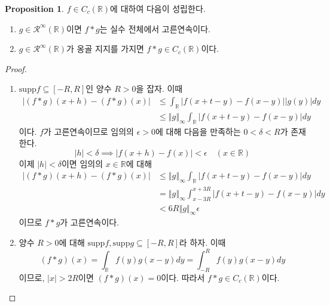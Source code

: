 \documentclass[11pt]{book}
\numberwithin{equation}{chapter}
\def\RR{\mathbb{R}}
\def\eps{\epsilon}
\def\calR{\mathcal{R}}
\newcommand{\abs}[1]{\left\vert#1\right\vert}
\newcommand{\norm}[1]{\left\Vert#1\right\Vert}
\theoremstyle{definition}
\newtheorem{prop}[thm]{Proposition}
\newenvironment{enum}
	{\begin{enumerate}[label=(\alph*), leftmargin=2\parindent]}
	{\end{enumerate}}
\begin{document}
\begin{prop}
    \(f \in C_c(\RR)\)에 대하여 다음이 성립한다.
    \begin{enum}
        \item \(g \in \calR^\infty(\RR)\)이면 \(f * g\)는 실수 전체에서 고른연속이다.
        \item \(g \in \calR^\infty(\RR)\)가 옹골 지지를 가지면 \(f * g \in C_c(\RR)\)이다.
    \end{enum}
\end{prop}
\begin{proof}
    \quad

    \begin{enum}
        \item
        \(\mathrm{supp} f \subseteq [-R, R]\)인 양수 \(R > 0\)을 잡자. 이때
        \begin{align*}
            \abs{(f*g)(x+h) - (f*g)(x)} &\le \int_{\RR} \abs{f(x+t-y) - f(x-y)} \abs{g(y)} dy\\
            &\le \norm{g}_{\infty} \int_{\RR} \abs{f(x+t-y) - f(x-y)} dy    
        \end{align*}
        이다. \(f\)가 고른연속이므로 임의의 \(\eps > 0\)에 대해 다음을 만족하는 \(0 < \delta < R\)가 존재한다.
        \[
        \abs{h} < \delta \implies \abs{f(x+h) - f(x)} < \eps \quad (x \in \RR)    
        \]
        이제 \(\abs{h} < \delta\)이면 임의의 \(x \in \RR\)에 대해
        \begin{align*}
            \abs{(f*g)(x+h) - (f*g)(x)} &\le \norm{g}_{\infty} \int_{\RR} \abs{f(x+t-y) - f(x-y)} dy    \\
            &= \norm{g}_{\infty} \int_{x-3R}^{x+3R} \abs{f(x+t-y) - f(x-y)} dy\\
            &< 6R\norm{g}_{\infty}\eps
        \end{align*}
        이므로 \(f*g\)가 고른연속이다.
        \item 양수 \(R > 0\)에 대해 \(\mathrm{supp}f, \mathrm{supp}g \subseteq [-R, R]\)라 하자. 이때
        \[
        (f*g)(x) = \int_{\RR} f(y) g(x - y) dy = \int_{-R}^R f(y) g(x - y) dy    
        \]
        이므로, \(\abs{x} > 2R\)이면 \((f*g)(x) = 0\)이다. 따라서 \(f*g \in C_c(\RR)\)이다.
    \end{enum}
\end{proof}
\end{document}
